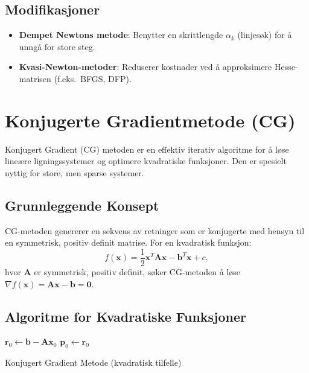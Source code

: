 \subsection{Modifikasjoner}
\begin{itemize}
  \item \textbf{Dempet Newtons metode}: Benytter en skrittlengde \(\alpha_k\) (linjesøk) for å unngå for store steg.
  \item \textbf{Kvasi-Newton-metoder}: Reduserer kostnader ved å approksimere Hesse-matrisen (f.eks.\ BFGS, DFP).
\end{itemize}


\section{Konjugerte Gradientmetode (CG)}
\label{sec:conjugate_gradient}

Konjugert Gradient (CG) metoden er en effektiv iterativ algoritme for å løse lineære ligningssystemer og optimere kvadratiske funksjoner. Den er spesielt nyttig for store, men sparse systemer.

\subsection{Grunnleggende Konsept}
CG-metoden genererer en sekvens av retninger som er konjugerte med hensyn til en symmetrisk, positiv definit matrise. For en kvadratisk funksjon:
\[
  f(\symbf{x}) = \frac{1}{2}\symbf{x}^T\symbf{A}\symbf{x} - \symbf{b}^T\symbf{x} + c,
\]
hvor \(\symbf{A}\) er symmetrisk, positiv definit, søker CG-metoden å løse \(\nabla f(\symbf{x}) = \symbf{A}\symbf{x} - \symbf{b} = \symbf{0}\).

\subsection{Algoritme for Kvadratiske Funksjoner}

\begin{algorithm}[H]
  \SetAlgoLined
  \(\symbf{r}_0 \gets \symbf{b} - \symbf{A}\symbf{x}_0\) 
  \(\symbf{p}_0 \gets \symbf{r}_0\) 
  \caption{Konjugert Gradient Metode (kvadratisk tilfelle)}
\end{algorithm}

